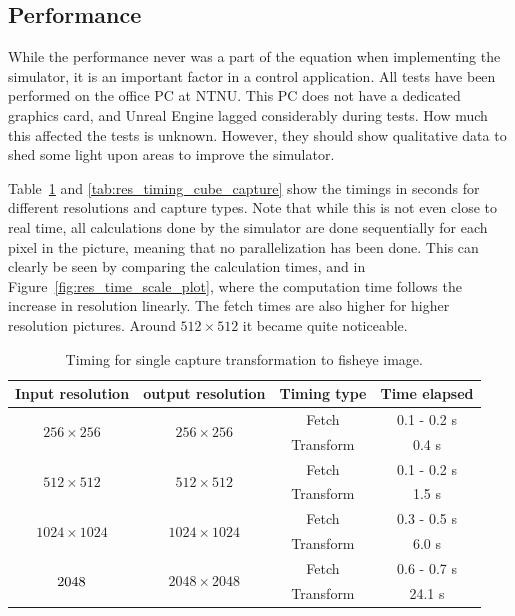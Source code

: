 \subsection{Performance} \label{sec:res_performance}

While the performance never was a part of the equation when implementing the simulator, it is an important factor in a control application. All tests have been performed on the office PC at NTNU. This PC does not have a dedicated graphics card, and Unreal Engine lagged considerably during tests. How much this affected the tests is unknown. However, they should show qualitative data to shed some light upon areas to improve the simulator.

Table~\ref{tab:res_timing_single} and \ref{tab:res_timing_cube_capture} show the timings in seconds for different resolutions and capture types. Note that while this is not even close to real time, all calculations done by the simulator are done sequentially for each pixel in the picture, meaning that no parallelization has been done. This can clearly be seen by comparing the calculation times, and in Figure~\ref{fig:res_time_scale_plot}, where the computation time follows the increase in resolution linearly. The fetch times are also higher for higher resolution pictures. Around $512\times 512$ it became quite noticeable. 

\begin{table}[!htb]
    \centering
    \caption{Timing for single capture transformation to fisheye image.}
    \label{tab:res_timing_single}
    \begin{tabular}{|c|c|c|c|} \hline
        \textbf{Input resolution} & \textbf{output resolution} & \textbf{Timing type} & \textbf{Time elapsed} \\ \hline \hline
        \multirow{2}{*}{$256 \times 256$} & \multirow{2}{*}{$256 \times 256$} & Fetch & 0.1 - 0.2 s \\ \cline{3-4}
         & & Transform & 0.4 s \\ \hline
        \multirow{2}{*}{$512 \times 512$} & \multirow{2}{*}{$512 \times 512$} & Fetch & 0.1 - 0.2 s\\ \cline{3-4}
         & & Transform & 1.5 s \\ \hline
        \multirow{2}{*}{$1024 \times 1024$} & \multirow{2}{*}{$1024 \times 1024$} & Fetch &  0.3 - 0.5 s \\ \cline{3-4}
         & & Transform & 6.0 s \\ \hline
        \multirow{2}{*}{$2048 \time 2048$} & \multirow{2}{*}{$2048 \times 2048$} & Fetch & 0.6 - 0.7 s\\ \cline{3-4}
         & & Transform & 24.1 s\\ \hline
    \end{tabular}
\end{table}

